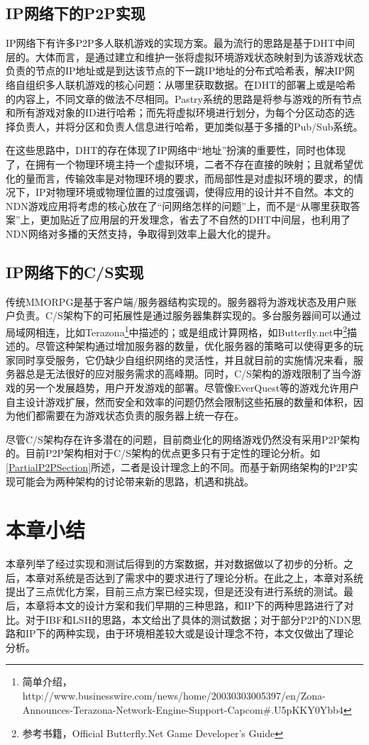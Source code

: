 \subsection{IP网络下的P2P实现}
\par
IP网络下有许多P2P多人联机游戏的实现方案。最为流行的思路是基于DHT中间层的。大体而言，是通过建立和维护一张将虚拟环境游戏状态映射到为该游戏状态负责的节点的IP地址或是到达该节点的下一跳IP地址的分布式哈希表，解决IP网络自组织多人联机游戏的核心问题：从哪里获取数据。在DHT的部署上或是哈希的内容上，不同文章的做法不尽相同。Pastry系统\cite{IPP2PMMORPG1}的思路是将参与游戏的所有节点和所有游戏对象的ID进行哈希；而先将虚拟环境进行划分，为每个分区动态的选择负责人，并将分区和负责人信息进行哈希，更加类似基于多播的Pub/Sub系统\cite{PubSubRef}。
\par
在这些思路中，DHT的存在体现了IP网络中“地址”扮演的重要性，同时也体现了，在拥有一个物理环境主持一个虚拟环境，二者不存在直接的映射；且就希望优化的量而言，传输效率是对物理环境的要求，而局部性是对虚拟环境的要求，的情况下，IP对物理环境或物理位置的过度强调，使得应用的设计并不自然。本文的NDN游戏应用将考虑的核心放在了“问网络怎样的问题”上，而不是“从哪里获取答案”上，更加贴近了应用层的开发理念，省去了不自然的DHT中间层，也利用了NDN网络对多播的天然支持，争取得到效率上最大化的提升。
\subsection{IP网络下的C/S实现}
\par
传统MMORPG是基于客户端/服务器结构实现的。服务器将为游戏状态及用户账户负责。C/S架构下的可拓展性是通过服务器集群实现的。多台服务器间可以通过局域网相连，比如Terazona\footnote{简单介绍，http://www.businesswire.com/news/home/20030303005397/en/Zona-Announces-Terazona-Network-Engine-Support-Capcom\#.U5pKKY0Ybb4}中描述的；或是组成计算网格，如Butterfly.net中\footnote{参考书籍，Official Butterfly.Net Game Developer's Guide}描述的。尽管这种架构通过增加服务器的数量，优化服务器的策略可以使得更多的玩家同时享受服务，它仍缺少自组织网络的灵活性，并且就目前的实施情况来看，服务器总是无法很好的应对服务需求的高峰期。同时，C/S架构的游戏限制了当今游戏的另一个发展趋势，用户开发游戏的部署。尽管像EverQuest等的游戏允许用户自主设计游戏扩展，然而安全和效率的问题仍然会限制这些拓展的数量和体积，因为他们都需要在为游戏状态负责的服务器上统一存在。
\par
尽管C/S架构存在许多潜在的问题，目前商业化的网络游戏仍然没有采用P2P架构的。目前P2P架构相对于C/S架构的优点更多只有于定性的理论分析。如\ref{PartialP2PSection}所述，二者是设计理念上的不同。而基于新网络架构的P2P实现可能会为两种架构的讨论带来新的思路，机遇和挑战。
\section{本章小结}
本章列举了经过实现和测试后得到的方案数据，并对数据做以了初步的分析。之后，本章对系统是否达到了需求中的要求进行了理论分析。在此之上，本章对系统提出了三点优化方案，目前三点方案已经实现，但是还没有进行系统的测试。最后，本章将本文的设计方案和我们早期的三种思路，和IP下的两种思路进行了对比。对于IBF和LSH的思路，本文给出了具体的测试数据；对于部分P2P的NDN思路和IP下的两种实现，由于环境相差较大或是设计理念不符，本文仅做出了理论分析。
